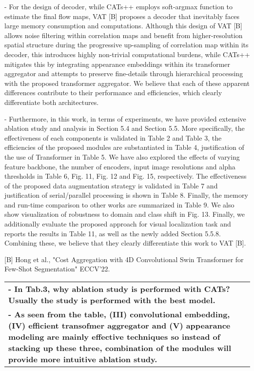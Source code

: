 \documentclass[11pt,draftclsnofoot,onecolumn]{IEEEtran}
\begin{document}
- For the design of decoder, while CATs++ employs soft-argmax function to estimate the final flow maps, VAT [B] proposes a decoder that inevitably faces large memory consumption and computations. Although this design of VAT [B] allows noise filtering within correlation maps and benefit from higher-resolution spatial structure during the progressive up-sampling of correlation map within its decoder, this introduces highly non-trivial computational burdens, while CATs++ mitigates this by integrating appearance embeddings within its transformer aggregator and attempts to preserve fine-details through hierarchical processing with the proposed transformer aggregator. We believe that each of these apparent differences contribute to their performance and efficiencies, which clearly differentiate both architectures. 


- Furthermore, in this work, in terms of experiments, we have provided extensive ablation study and analysis in Section 5.4 and Section 5.5. More specifically, the effectiveness of each components is validated in Table 2 and Table 3, the efficiencies of the proposed modules are substantiated in Table 4, justification of the use of Transformer in Table 5. We have also explored the effects of varying feature backbone, the number of encoders,  input image resolutions and alpha thresholds  in Table 6, Fig. 11, Fig. 12 and Fig. 15, respectively. The effectiveness of the proposed data augmentation strategy is validated in Table 7 and justification of serial/parallel processing is shown in Table 8. Finally, the memory and run-time comparison to other works are summarized in Table 9. We also show visualization of robustness to domain and class shift in Fig. 13. Finally, we additionally evaluate the proposed approach for visual localization task and reports the results in Table 11, as well as the newly added Section 5.5.8.   Combining these, we believe that they clearly differentiate this work to VAT [B]. 

[B] Hong et al., "Cost Aggregation with 4D Convolutional Swin Transformer for Few-Shot Segmentation" ECCV'22. 
\newpage

\begin{longtable}{|p{16cm}|}
	\hline 
        \textbf{-  In Tab.3, why ablation study is performed with CATs? Usually the study is performed with the best model.}\\
		\textbf{- As seen from the table, (III) convolutional embedding, (IV) efficient transofmer aggregator and (V) appearance modeling are mainly effective techniques so instead of stacking up these three, combination of the modules will provide more intuitive ablation study.}\\
	\hline 
\end{longtable}
\end{document}

